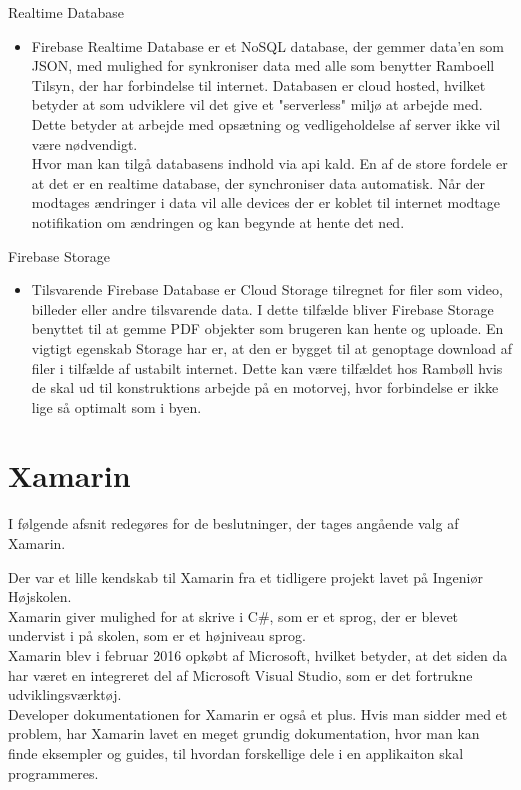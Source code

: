 	Realtime Database\cite{FirebaseRealtimeDB}
		\begin{itemize}[-]
			\itemsep 0.3em 
			\item[]  Firebase Realtime Database er et NoSQL database, der gemmer data'en som JSON\cite{JSON}, med mulighed for synkroniser data med alle som benytter Ramboell Tilsyn, der har forbindelse til internet. Databasen er cloud hosted, hvilket betyder at som udviklere vil det give et "serverless" miljø at arbejde med. Dette betyder at arbejde med opsætning og vedligeholdelse af server ikke vil være nødvendigt. \\ Hvor man kan tilgå databasens indhold via api kald. 
			En af de store fordele er at det er en realtime database, der synchroniser data automatisk. Når der modtages ændringer i data vil alle devices der er koblet til internet modtage notifikation om ændringen og kan begynde at hente det ned. 
		\end{itemize}
		
		Firebase Storage\cite{FirebaseStorage}
			\begin{itemize}[-]
				\itemsep 0.3em 
				\item[] Tilsvarende Firebase Database er Cloud Storage tilregnet for filer som video, billeder eller andre tilsvarende data. I dette tilfælde bliver Firebase Storage benyttet til at gemme PDF objekter som brugeren kan hente og uploade. En vigtigt egenskab Storage har er, at den er bygget til at genoptage download af filer i tilfælde af ustabilt internet. Dette kan være tilfældet hos Rambøll hvis de skal ud til konstruktions arbejde på en motorvej, hvor forbindelse er ikke lige så optimalt som i byen. \\
			\end{itemize}
		
	\section{Xamarin}
		I følgende afsnit redegøres for de beslutninger, der tages angående valg af Xamarin.
		
		Der var et lille kendskab til Xamarin fra et tidligere projekt lavet på Ingeniør Højskolen. \\
		Xamarin giver mulighed for at skrive i C\#, som er et sprog, der er blevet undervist i på skolen, som er et højniveau sprog. \\
		Xamarin blev i februar 2016 opkøbt af Microsoft, hvilket betyder, at det siden da har været en integreret del af Microsoft Visual Studio, som er det fortrukne udviklingsværktøj.\\			Developer dokumentationen for Xamarin er også et plus. Hvis man sidder med et problem, har Xamarin lavet en meget grundig dokumentation, hvor man kan finde eksempler og guides, til hvordan forskellige dele i en applikaiton skal programmeres.
		
